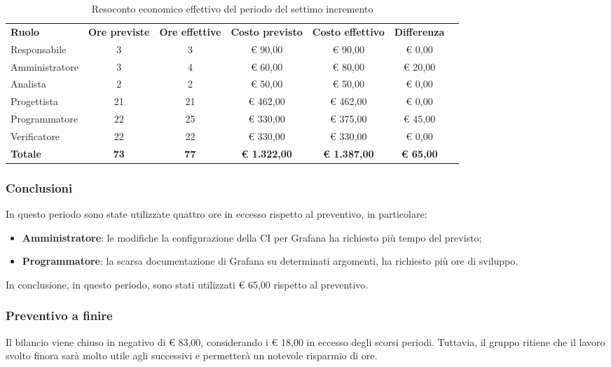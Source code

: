 \documentclass[../piano-di-progetto.tex]{subfiles}
\begin{document}
  \begin{table}[H]
    \centering
    \begin{tabular}{lcccccc}
      \rowcolor{lightgray}
      \textbf{Ruolo}  & \textbf{Ore previste} & \textbf{Ore effettive} & \textbf{Costo previsto} & \textbf{Costo effettivo} & \textbf{Differenza} \\
Responsabile    & 3           & 3           & € 90,00             & € 90,00             & € 0,00           \\
Amministratore  & 3           & 4           & € 60,00             & € 80,00             & € 20,00          \\
Analista        & 2           & 2           & € 50,00             & € 50,00             & € 0,00           \\
Progettista     & 21          & 21          & € 462,00            & € 462,00            & € 0,00           \\
Programmatore   & 22          & 25          & € 330,00            & € 375,00            & € 45,00          \\
Verificatore    & 22          & 22          & € 330,00            & € 330,00            & € 0,00           \\
\textbf{Totale} & \textbf{73} & \textbf{77} & \textbf{€ 1.322,00} & \textbf{€ 1.387,00} & \textbf{€ 65,00}
    \end{tabular}
    \caption{Resoconto economico effettivo del periodo del settimo incremento}
  \end{table}


\subsubsection{Conclusioni}
In questo periodo sono state utilizzate quattro ore in eccesso rispetto al preventivo, in particolare:
\begin{itemize}
    \item \textbf{Amministratore}: le modifiche la configurazione della CI per Grafana ha richiesto più tempo del previsto;
    \item \textbf{Programmatore}: la scarsa documentazione di Grafana su determinati argomenti, ha richiesto più ore di sviluppo.
\end{itemize}
In conclusione, in questo periodo, sono stati utilizzati € 65,00 rispetto al preventivo.

\subsubsection{Preventivo a finire}
Il bilancio viene chiuso in negativo di € 83,00, considerando i € 18,00 in eccesso degli scorsi periodi. Tuttavia, il gruppo ritiene che il lavoro svolto finora sarà molto utile agli successivi e permetterà un notevole risparmio di ore.
\end{document}
